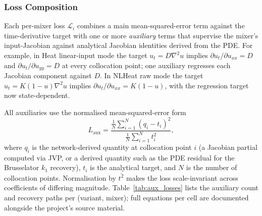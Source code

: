 \documentclass[10pt,journal,compsoc]{IEEEtran}
\begin{document}
\subsubsection{Loss Composition}\label{subsubsec:loss_composition}

Each per-mixer loss $\mathcal{L}_i$ combines a main mean-squared-error
term against the time-derivative target with one or more
\emph{auxiliary} terms that supervise the mixer's input-Jacobian against
analytical Jacobian identities derived from the PDE. For example, in
Heat linear-input mode the target $u_t = D \nabla^2 u$ implies
$\partial u_t / \partial u_{xx} = D$ and
$\partial u_t / \partial u_{yy} = D$ at every collocation point; one
auxiliary regresses each Jacobian component against $D$. In NLHeat raw
mode the target $u_t = K(1{-}u)\nabla^2 u$ implies
$\partial u_t / \partial u_{xx} = K(1{-}u)$, with the regression target
now state-dependent.

All auxiliaries use the normalised mean-squared-error form
\begin{equation}\label{eq:aux_nmse}
L_{\text{aux}} = \frac{\frac{1}{N}\sum_{i=1}^N (q_i - t_i)^2}
                       {\frac{1}{N}\sum_{i=1}^N t_i^2},
\end{equation}
where $q_i$ is the network-derived quantity at collocation point $i$ (a
Jacobian partial computed via JVP, or a derived quantity such as the
PDE residual for the Brusselator $k_1$ recovery), $t_i$ is the
analytical target, and $N$ is the number of collocation points.
Normalisation by $\overline{t^2}$ makes the loss scale-invariant across
coefficients of differing magnitude. Table~\ref{tab:aux_losses} lists
the auxiliary count and recovery paths per (variant, mixer); full
equations per cell are documented alongside the project's source
material.
\end{document}
